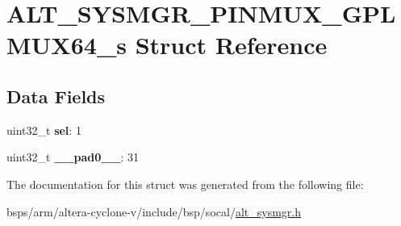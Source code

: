 \hypertarget{structALT__SYSMGR__PINMUX__GPLMUX64__s}{}\section{A\+L\+T\+\_\+\+S\+Y\+S\+M\+G\+R\+\_\+\+P\+I\+N\+M\+U\+X\+\_\+\+G\+P\+L\+M\+U\+X64\+\_\+s Struct Reference}
\label{structALT__SYSMGR__PINMUX__GPLMUX64__s}
\subsection*{Data Fields}
\begin{DoxyCompactItemize}
\item 
\mbox{\label{structALT__SYSMGR__PINMUX__GPLMUX64__s_a4c377469caa87e7d7a3670ca3ead34dc}} 
uint32\+\_\+t {\bfseries sel}\+: 1
\item 
\mbox{\label{structALT__SYSMGR__PINMUX__GPLMUX64__s_a59c4292de78626cba54b7fde775e3e82}} 
uint32\+\_\+t {\bfseries \+\_\+\+\_\+pad0\+\_\+\+\_\+}\+: 31
\end{DoxyCompactItemize}


The documentation for this struct was generated from the following file\+:\begin{DoxyCompactItemize}
\item 
bsps/arm/altera-\/cyclone-\/v/include/bsp/socal/\mbox{\hyperlink{alt__sysmgr_8h}{alt\+\_\+sysmgr.\+h}}\end{DoxyCompactItemize}

